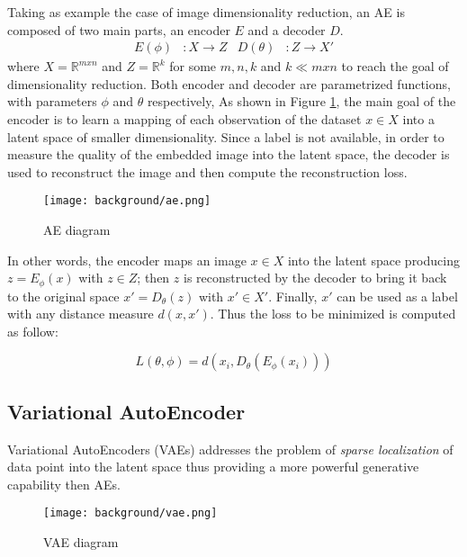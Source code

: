 Taking as example the case of image dimensionality reduction, an AE is composed of two main parts, an encoder $E$ and a decoder $D$. 
\begin{align}
  E(\phi) &:  X \rightarrow Z & D(\theta) &:  Z \rightarrow X'
\end{align}
where $X = \mathbb{R}^{mxn}$ and $Z = \mathbb{R}^{k }$ for some $m,n,k$ and $k\ll mxn$ to reach the goal of dimensionality reduction. Both encoder and decoder are parametrized functions, with parameters $\phi$ and $\theta$ respectively,
As shown in Figure \ref{fig:ae}, the main goal of the encoder is to learn a mapping of each observation of the dataset $x \in X$ into a latent space of smaller dimensionality.  Since a label is not available, in order to measure the quality of the embedded image into the latent space, the decoder is used to reconstruct the image and then compute the reconstruction loss.

\begin{figure}[h]
  \begin{center}
    \texttt{[image: background/ae.png]}
  \end{center}
  \caption{AE diagram}
  \label{fig:ae}
\end{figure}

In other words, the encoder maps an image $x\in X$ into the latent space producing ${z=E_{\phi }(x)}$ with $z\in Z$; then $z$ is reconstructed by the decoder to bring it back to the original space ${x'=D_{\theta }(z)}$ with $x'\in X'$. Finally, $x'$ can be used as a label with any distance measure $d(x,x')$. Thus the loss to be minimized is computed as follow:

\begin{equation}
\label{eq:aeloss}
  L(\theta ,\phi ) = d(x_{i},D_{\theta }(E_{\phi }(x_{i})))
\end{equation}

\subsection{Variational AutoEncoder}

Variational AutoEncoders (VAEs) addresses the problem of \textit{sparse localization} of data point into the latent space thus providing a more powerful generative capability then AEs.

\begin{figure}[h]
  \begin{center}
    \texttt{[image: background/vae.png]}
  \end{center}
  \caption{VAE diagram}
  \label{fig:vae}
\end{figure}

